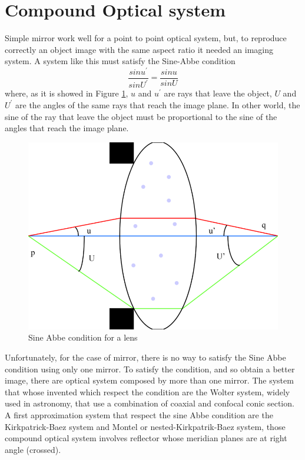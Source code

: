 \section{Compound Optical system}
Simple mirror work well for a point to point optical system, but, to reproduce correctly an object image with the same aspect ratio it needed an imaging system. A system like this must satisfy the Sine-Abbe condition
\begin{equation}
\frac{sin u^{'}}{sin U^{'}} = \frac{sin u}{ sin U}
\label{eq: SineAbbe}
\end{equation} 
\noindent where, as it is showed in Figure \ref{fig: SineAbbe}, $u $ and $u^{'} $ are rays that leave the object, $U$ and $U^{'} $ are the angles of the same rays that reach the image plane. In other world, the sine of the ray that leave the object must be proportional to the sine of the angles that reach the image plane.
\begin{figure}[]
%
\centering
%
\includegraphics[width=.6\textwidth]{Immagini/Chapter2/SineAbbeCondition}
%
\caption{Sine Abbe condition for a lens}
%
\label{fig: SineAbbe}
%
\end{figure}
Unfortunately, for the case of mirror, there is no way to satisfy the Sine Abbe condition using only one mirror. To satisfy the condition, and so obtain a better image, there are optical system composed by more than one mirror. The system that whose invented which respect the condition are the Wolter system, widely used in astronomy, that use a combination of coaxial and confocal conic section. A first approximation system that respect the sine Abbe condition are the Kirkpatrick-Baez system and Montel or nested-Kirkpatrik-Baez system, those compound optical system involves reflector whose meridian planes are at right angle (crossed).
